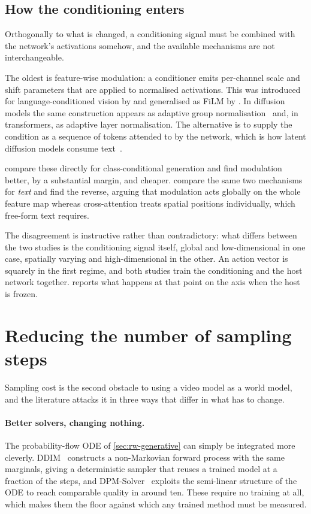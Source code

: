 \subsection{How the conditioning enters}
\label{sec:rw-conditioning}

Orthogonally to what is changed, a conditioning signal must be combined with
the network's activations somehow, and the available mechanisms are not
interchangeable.

The oldest is feature-wise modulation: a conditioner emits per-channel
scale and shift parameters that are applied to normalised activations. This
was introduced for language-conditioned vision by
\citet{devries2017cbn} and generalised as FiLM by \citet{perez2018film}. In
diffusion models the same construction appears as adaptive group
normalisation~\citep{dhariwal2021adm} and, in transformers, as adaptive
layer normalisation. The alternative is to supply the condition as a
sequence of tokens attended to by the network, which is how latent diffusion
models consume text~\citep{rombach2022ldm}.

\citet{peebles2023dit} compare these directly for class-conditional
generation and find modulation better, by a substantial margin, and cheaper.
\citet{chen2024gentron} compare the same two mechanisms for \emph{text} and
find the reverse, arguing that modulation acts globally on the whole feature
map whereas cross-attention treats spatial positions individually, which
free-form text requires.

The disagreement is instructive rather than contradictory: what differs
between the two studies is the conditioning signal itself, global and
low-dimensional in one case, spatially varying and high-dimensional in the
other. An action vector is squarely in the first regime, and both studies
train the conditioning and the host network together. 
reports what happens at that point on the axis when the host is frozen.

\section{Reducing the number of sampling steps}
\label{sec:rw-few-step}

Sampling cost is the second obstacle to using a video model as a world
model, and the literature attacks it in three ways that differ in what has
to change.

\paragraph{Better solvers, changing nothing.} The probability-flow ODE of
\cref{sec:rw-generative} can simply be integrated more cleverly.
DDIM~\citep{song2021ddim} constructs a non-Markovian forward process with
the same marginals, giving a deterministic sampler that reuses a trained
model at a fraction of the steps, and DPM-Solver~\citep{lu2022dpmsolver,
lu2022dpmsolverpp} exploits the semi-linear structure of the ODE to reach
comparable quality in around ten. These require no training at all, which
makes them the floor against which any trained method must be measured.

